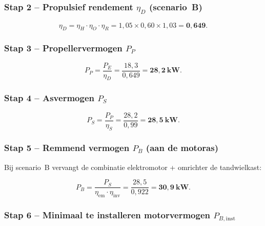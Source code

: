 \subsubsection*{Stap 2 – Propulsief rendement $\eta_D$ (scenario~B)}
 
\begin{equation}
    \eta_D = \eta_H \cdot \eta_O \cdot \eta_R
           = 1{,}05 \times 0{,}60 \times 1{,}03
           = \mathbf{0{,}649}.
    \label{eq:etaD}
\end{equation}
 
\subsubsection*{Stap 3 – Propellervermogen $P_P$}
 
\begin{equation}
    P_P = \frac{P_E}{\eta_D}
        = \frac{18{,}3}{0{,}649}
        = \mathbf{28{,}2}\ \mathbf{kW}.
    \label{eq:PP}
\end{equation}
 
\subsubsection*{Stap 4 – Asvermogen $P_S$}
 
\begin{equation}
    P_S = \frac{P_P}{\eta_S}
        = \frac{28{,}2}{0{,}99}
        = \mathbf{28{,}5}\ \mathbf{kW}.
    \label{eq:PS}
\end{equation}
 
\subsubsection*{Stap 5 – Remmend vermogen $P_B$ (aan de motoras)}
 
Bij scenario~B vervangt de combinatie elektromotor + omrichter de tandwielkast:
 
\begin{equation}
    P_B = \frac{P_S}{\eta_\mathrm{em} \cdot \eta_\mathrm{inv}}
        = \frac{28{,}5}{0{,}922}
        = \mathbf{30{,}9}\ \mathbf{kW}.
    \label{eq:PB}
\end{equation}
 
\subsubsection*{Stap 6 – Minimaal te installeren motorvermogen $P_{B,\mathrm{inst}}$}
 
